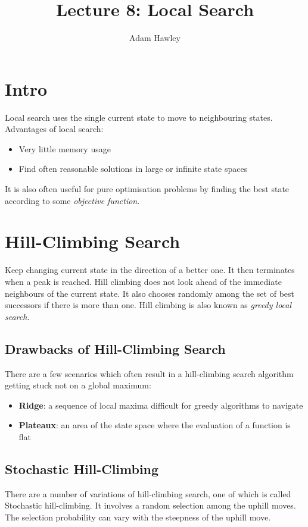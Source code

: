 \documentclass{article}
\author{Adam Hawley}
\title{Lecture 8: Local Search}
\begin{document}
\maketitle

\section{Intro}
Local search uses the single current state to move to neighbouring states.
Advantages of local search:
\begin{itemize}
	\item Very little memory usage
	\item Find often reasonable solutions in large or infinite state spaces
\end{itemize}
It is also often useful for pure optimisation problems by finding the best state according to some \textit{objective function}.

\section{Hill-Climbing Search}
Keep changing current state in the direction of a better one.
It then terminates when a peak is reached.
Hill climbing does not look ahead of the immediate neighbours of the current state.
It also chooses randomly among the set of best successors if there is more than one.
Hill climbing is also known as \textit{greedy local search}.

\subsection{Drawbacks of Hill-Climbing Search}
There are a few scenarios which often result in a hill-climbing search algorithm getting stuck  not on a global maximum:
\begin{itemize}
	\item \textbf{Ridge}: a sequence of local maxima difficult for greedy algorithms to navigate
	\item \textbf{Plateaux}: an area of the state space where the evaluation of a function is flat
\end{itemize}

\subsection{Stochastic Hill-Climbing}
There are a number of variations of hill-climbing search, one of which is called Stochastic hill-climbing.
It involves a random selection among the uphill moves.
The selection probability can vary with the steepness of the uphill move.
\end{document}
